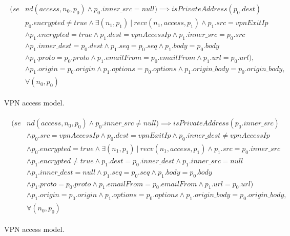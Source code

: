 \begin{figure}[!h]
	{\footnotesize
		\begin{subequations}
			\begin{align}
			\begin{split}
			(se& nd(access, n_{0}, p_{0}) \wedge p_{0}.inner\_src = null) \implies isPrivateAddress(p_{0}.dest) \\
			& p_{0}.encrypted \neq true \wedge \exists (n_{1}, p_{1}) \: | \: recv(n_{1}, access, p_{1}) \wedge p_{1}.src = vpnExitIp \\
			& \wedge p_{1}.encrypted = true \wedge p_{1}.dest = vpnAccessIp \wedge p_{1}.inner\_src = p_{0}.src \\
			& \wedge p_{1}.inner\_dest = p_{0}.dest \wedge p_{1}.seq = p_{0}.seq \wedge p_{1}.body = p_{0}.body \\
			& \wedge p_{1}.proto = p_{0}.proto \wedge p_{1}.emailFrom = p_{0}.emailFrom \wedge p_{1}.url = p_{0}.url), \\
			& \wedge p_{1}.origin = p_{0}.origin   \wedge p_{1}.options = p_{0}.options \wedge p_{1}.origin\_body = p_{0}.origin\_body , \\
			& \forall (n_{0}, p_{0})
			\end{split}
			\end{align}
		\end{subequations}
	}%
	\caption{VPN access model.}
	\label{access_constr1}
\end{figure}

\begin{figure}[!h]
	{\footnotesize
		\begin{subequations}
			\begin{align}\
			\begin{split}
			\label{access_constr2}
			(se& nd(access, n_{0}, p_{0}) \wedge p_{0}.inner\_src \neq null) \implies isPrivateAddress(p_{0}.inner\_src) \\
			& \wedge p_{0}.src = vpnAccessIp \wedge p_{0}.dest = vpnExitIp \wedge p_{0}.inner\_dest \neq vpnAccessIp \\
			& \wedge p_{0}.encrypted = true \wedge \exists (n_{1}, p_{1}) \: | \: recv(n_{1}, access, p_{1}) \wedge p_{1}.src = p_{0}.inner\_src \\
			& \wedge p_{1}.encrypted \neq true \wedge p_{1}.dest =  p_{0}.inner\_dest \wedge p_{1}.inner\_src = null \\
			& \wedge p_{1}.inner\_dest = null \wedge p_{1}.seq = p_{0}.seq \wedge p_{1}.body = p_{0}.body \\
			& \wedge p_{1}.proto = p_{0}.proto \wedge p_{1}.emailFrom = p_{0}.emailFrom \wedge p_{1}.url = p_{0}.url) \\
			& \wedge p_{1}.origin = p_{0}.origin   \wedge p_{1}.options = p_{0}.options \wedge p_{1}.origin\_body = p_{0}.origin\_body , \\
			& \forall (n_{0}, p_{0})
			\end{split}
			\end{align}
		\end{subequations}
	}%
	\caption{VPN access model.}
	\label{vpn_access}
\end{figure}



